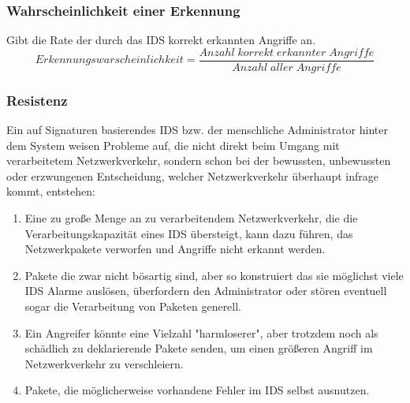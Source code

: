 \subsubsection{Wahrscheinlichkeit einer Erkennung}
Gibt die Rate der durch das IDS korrekt erkannten Angriffe an.\\
\[Erkennungswarscheinlichkeit  = \frac{Anzahl\;korrekt\;erkannter\;Angriffe} {Anzahl\;aller\;Angriffe}\]
\subsubsection{Resistenz}
Ein auf Signaturen basierendes IDS bzw. der menschliche Administrator hinter dem System weisen Probleme auf, die nicht direkt beim Umgang mit verarbeitetem Netzwerkverkehr, sondern schon bei der bewussten, unbewussten oder erzwungenen Entscheidung, welcher Netzwerkverkehr überhaupt infrage kommt, entstehen:
\begin{enumerate}
\item{Eine zu große Menge an zu verarbeitendem Netzwerkverkehr, die die Verarbeitungskapazität eines IDS übersteigt, kann dazu führen, das Netzwerkpakete verworfen und Angriffe nicht erkannt werden.}
\item{Pakete die zwar nicht bösartig sind, aber so konstruiert das sie möglichst viele IDS Alarme auslösen, überfordern den Administrator oder stören eventuell sogar die Verarbeitung von Paketen generell. }
\item{Ein Angreifer könnte eine Vielzahl "harmloserer", aber trotzdem noch als schädlich zu deklarierende Pakete senden, um einen größeren Angriff im Netzwerkverkehr zu verschleiern.}
\item{Pakete, die möglicherweise vorhandene Fehler im IDS selbst ausnutzen.}
\end{enumerate}
